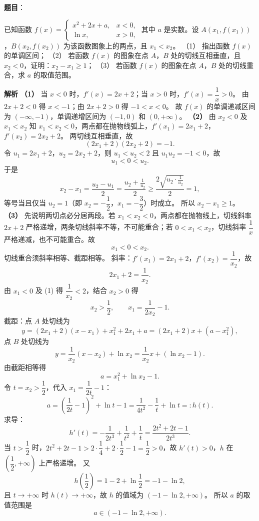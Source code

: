 \begin{answer}

\textbf{题目}：

已知函数 $f(x)=\begin{cases}x^2+2x+a,&x<0,\\[2pt] \ln x,&x>0,\end{cases}$ 其中 $a$ 是实数。设 $A(x_1,f(x_1))$，$B(x_2,f(x_2))$ 为该函数图象上的两点，且 $x_1<x_2$。
（1） 指出函数 $f(x)$ 的单调区间；
（2） 若函数 $f(x)$ 的图象在点 $A$，$B$ 处的切线互相垂直，且 $x_2<0$，证明：$x_2-x_1\geqslant1$；
（3） 若函数 $f(x)$ 的图象在点 $A$，$B$ 处的切线重合，求 $a$ 的取值范围。

\textbf{解析}
\textbf{（1）} 当 $x<0$ 时，$f'(x)=2x+2$；当 $x>0$ 时，$f'(x)=\dfrac1x>0$。
由 $2x+2<0$ 得 $x<-1$；由 $2x+2>0$ 得 $-1<x<0$。
故 $f(x)$ 的单调递减区间为 $(-\infty,-1)$，单调递增区间为 $(-1,0)$ 和 $(0,+\infty)$。
\textbf{（2）} 由 $x_2<0$ 及 $x_1<x_2$ 知 $x_1<x_2<0$，两点都在抛物线弧上，$f'(x_1)=2x_1+2$，$f'(x_2)=2x_2+2$。
两切线互相垂直，故
\nopagebreak[4]
\[(2x_1+2)(2x_2+2)=-1.\]
令 $u_1=2x_1+2$，$u_2=2x_2+2$，则 $u_1<u_2<2$ 且 $u_1u_2=-1<0$，故
\nopagebreak[4]
\[u_1<0<u_2.\]
于是
\nopagebreak[4]
\[x_2-x_1=\frac{u_2-u_1}2=\frac{u_2+\frac1{u_2}}2\geqslant\frac{2\sqrt{u_2\cdot\frac1{u_2}}}2=1,\]
等号当且仅当 $u_2=1$（即 $x_2=-\dfrac12$，$x_1=-\dfrac32$）时成立。
所以 $x_2-x_1\geqslant1$。
\textbf{（3）} 先说明两切点必分居两段。若 $x_1<x_2<0$，两点都在抛物线上，切线斜率 $2x+2$ 严格递增，两条切线斜率不等，不可能重合；若 $0<x_1<x_2$，切线斜率 $\dfrac1x$ 严格递减，也不可能重合。故
\nopagebreak[4]
\[x_1<0<x_2.\]
切线重合须斜率相等、截距相等。
斜率：$f'(x_1)=2x_1+2$，$f'(x_2)=\dfrac1{x_2}$，故
\nopagebreak[4]
\[2x_1+2=\frac1{x_2}. \tag{1}\]
由 $x_1<0$ 及 (1) 得 $\dfrac1{x_2}<2$，结合 $x_2>0$ 得
\nopagebreak[4]
\[x_2>\frac12,\qquad x_1=\frac1{2x_2}-1.\]
截距：点 $A$ 处切线为
\nopagebreak[4]
\[y=(2x_1+2)(x-x_1)+x_1^2+2x_1+a=(2x_1+2)x+\left(a-x_1^2\right),\]
点 $B$ 处切线为
\nopagebreak[4]
\[y=\frac1{x_2}(x-x_2)+\ln x_2=\frac1{x_2}x+\left(\ln x_2-1\right).\]
由截距相等得
\nopagebreak[4]
\[a=x_1^2+\ln x_2-1.\]
令 $t=x_2>\dfrac12$，代入 $x_1=\dfrac1{2t}-1$：
\nopagebreak[4]
\[a=\left(\frac1{2t}-1\right)^2+\ln t-1=\frac1{4t^2}-\frac1t+\ln t=:h(t).\]
求导：
\nopagebreak[4]
\[h'(t)=-\frac1{2t^3}+\frac1{t^2}+\frac1t=\frac{2t^2+2t-1}{2t^3}.\]
当 $t>\dfrac12$ 时，$2t^2+2t-1>2\cdot\dfrac14+2\cdot\dfrac12-1=\dfrac12>0$，故 $h'(t)>0$，$h$ 在 $\left(\dfrac12,+\infty\right)$ 上严格递增。
又
\nopagebreak[4]
\[h\left(\frac12\right)=1-2+\ln\frac12=-1-\ln2,\]
且 $t\to+\infty$ 时 $h(t)\to+\infty$，故 $h$ 的值域为 $\left(-1-\ln2,+\infty\right)$。
所以 $a$ 的取值范围是
\nopagebreak[4]
\[a\in\left(-1-\ln2,+\infty\right).\]




\end{answer}